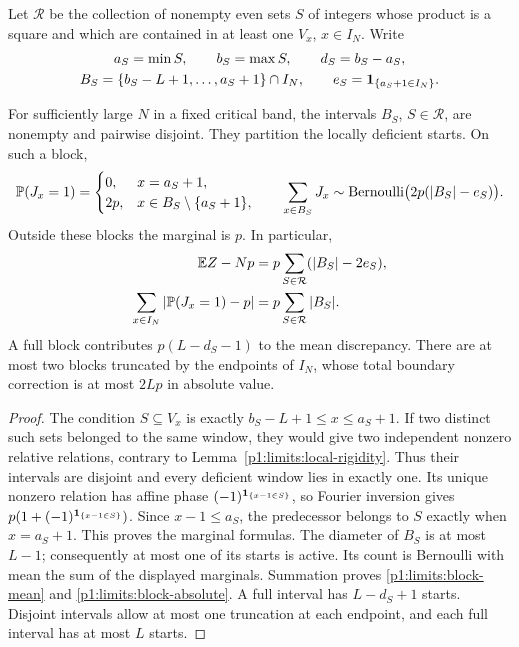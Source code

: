 Let $\mathcal R$ be the collection of nonempty even sets $S$ of integers
whose product is a square and which are contained in at least one
$V_x$, $x\in I_N$.  Write
\[
 \begin{gathered}
 a_S=\min S,\qquad b_S=\max S,\qquad d_S=b_S-a_S,\\
 B_S=\{b_S-L+1,\ldots,a_S+1\}\cap I_N,\qquad
 e_S=\ind_{\{a_S+1\in I_N\}}.
 \end{gathered}
\]

\begin{proposition}
\label{p1:limits:local-blocks}
For sufficiently large $N$ in a fixed critical band, the intervals
$B_S$, $S\in\mathcal R$, are nonempty and pairwise disjoint.
They partition the locally deficient starts.  On such a block,
\begin{equation}
 \P(J_x=1)=
 \begin{cases}0,&x=a_S+1,\\2p,&x\in B_S\setminus\{a_S+1\},\end{cases}
 \qquad
 \sum_{x\in B_S}J_x\sim\mathrm{Bernoulli}\bigl(2p(|B_S|-e_S)\bigr).
 \label{p1:limits:block-law}
\end{equation}
Outside these blocks the marginal is $p$.  In particular,
\begin{align}
 \E Z-Np&=p\sum_{S\in\mathcal R}(|B_S|-2e_S),
       \label{p1:limits:block-mean}\\
 \sum_{x\in I_N}|\P(J_x=1)-p|
       &=p\sum_{S\in\mathcal R}|B_S|.
       \label{p1:limits:block-absolute}
\end{align}
A full block contributes $p(L-d_S-1)$ to the mean discrepancy.
There are at most two blocks truncated by the endpoints of $I_N$,
whose total boundary correction is at most $2Lp$ in absolute value.
\end{proposition}
\begin{proof}
The condition $S\subseteq V_x$ is exactly
$b_S-L+1\le x\le a_S+1$.  If two distinct such sets belonged
to the same window, they would give two independent nonzero
relative relations, contrary to Lemma~\ref{p1:limits:local-rigidity}.
Thus their intervals are disjoint and every deficient window lies
in exactly one.  Its unique nonzero relation has affine phase
$(-1)^{\ind_{\{x-1\in S\}}}$, so Fourier inversion gives
$p(1+(-1)^{\ind_{\{x-1\in S\}}})$.  Since $x-1\le a_S$,
the predecessor belongs to $S$ exactly when $x=a_S+1$.
This proves the marginal formulas.  The diameter of $B_S$ is at
most $L-1$; consequently at most one of its starts is active.
Its count is Bernoulli with mean the sum of the displayed
marginals.  Summation proves \eqref{p1:limits:block-mean} and
\eqref{p1:limits:block-absolute}.  A full interval has
$L-d_S+1$ starts.  Disjoint intervals allow at most one truncation
at each endpoint, and each full interval has at most $L$ starts.
\end{proof}

